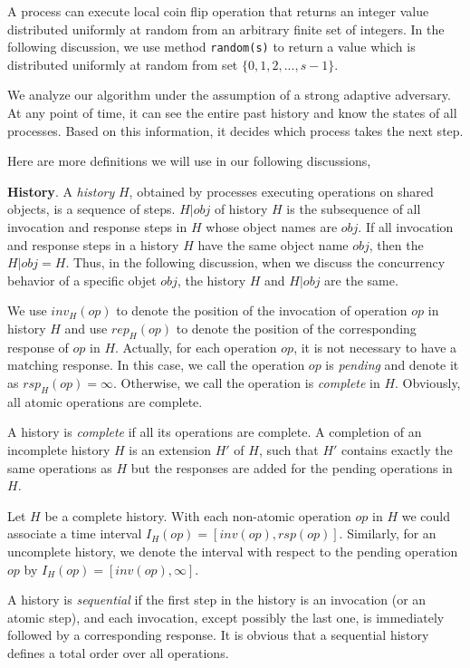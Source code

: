 A process can execute local coin flip operation that returns an integer value distributed uniformly at random from an arbitrary finite set of integers. In the following discussion, we use method \texttt{random(s)} to return a value which is distributed uniformly at random from set $\{0, 1, 2,..., s-1\}$. 

We analyze our algorithm under the assumption of a strong adaptive adversary. At any point of time, it can see the entire past history and know the states of all processes. Based on this information, it decides which process takes the next step.

Here are more definitions we will use in our following discussions,

\textbf{History}. A \emph{history} $H$, obtained by processes executing operations on shared objects, is a sequence of steps. $H|obj$ of history $H$ is the subsequence of all invocation and response steps in $H$ whose object names are $obj$. If all invocation and response steps in a history $H$ have the same object name $obj$, then the $H|obj = H$. Thus, in the following discussion, when we discuss the concurrency behavior of a specific objet $obj$, the history $H$ and $H|obj$ are the same.

We use $inv_H(op)$ to denote the position of the invocation of operation $op$ in history $H$ and use $rep_H(op)$ to denote the position of the corresponding response of $op$ in $H$. Actually, for each operation $op$, it is not necessary to have a matching response. In this case, we call the operation $op$ is \emph{pending} and denote it as $rsp_H(op) = \infty$. Otherwise, we call the operation is \emph{complete} in $H$. Obviously, all atomic operations are complete.

A history is \emph{complete} if all its operations are complete. A completion of an incomplete history $H$ is an extension $H'$ of $H$, such that $H'$ contains exactly the same operations as $H$ but the responses are added for the pending operations in $H$.

Let $H$ be a complete history. With each non-atomic operation $op$ in $H$ we could associate a time interval $I_H(op) = [inv(op), rsp(op)]$. Similarly, for an uncomplete history, we denote the interval with respect to the pending operation $op$ by $I_H(op) = [inv(op), \infty]$.

A history is \emph{sequential} if the first step in the history is an invocation (or an atomic step), and each invocation, except possibly the last one, is immediately followed by a corresponding response. It is obvious that a sequential history defines a total order over all operations.

